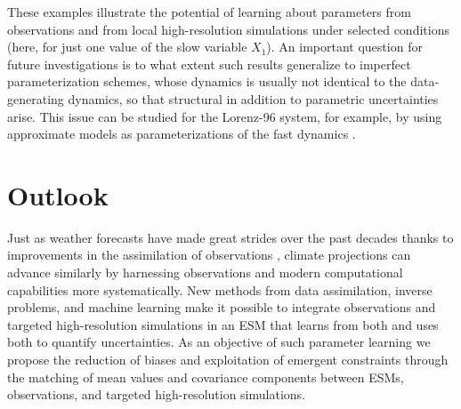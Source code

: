 \documentclass[draft]{agujournal}
\begin{document}
These examples illustrate the potential of learning about parameters from observations and from local high-resolution simulations under selected conditions (here, for just one value of the slow variable $X_1$). An important question for future investigations is to what extent such results generalize to imperfect parameterization schemes, whose dynamics is usually not identical to the data-generating dynamics, so that structural in addition to parametric uncertainties arise. This issue can be studied for the Lorenz-96 system, for example, by using approximate models as parameterizations of the fast dynamics \citep[e.g.,][]{Fatkullin04a,Wilks05a,Crommelin08a}.



\section{Outlook}\label{s:discussion}

Just as weather forecasts have made great strides over the past decades thanks to improvements in the assimilation of observations \citep{Bauer15a}, climate projections can advance similarly by harnessing observations and modern computational capabilities more systematically. New methods from data assimilation, inverse problems, and machine learning make it possible to integrate observations and targeted high-resolution simulations in an ESM that learns from both and uses both to quantify uncertainties. As an objective of such parameter learning we propose the reduction of biases and exploitation of emergent constraints through the matching of mean values and covariance components between ESMs, observations, and targeted high-resolution simulations. 
\end{document}
